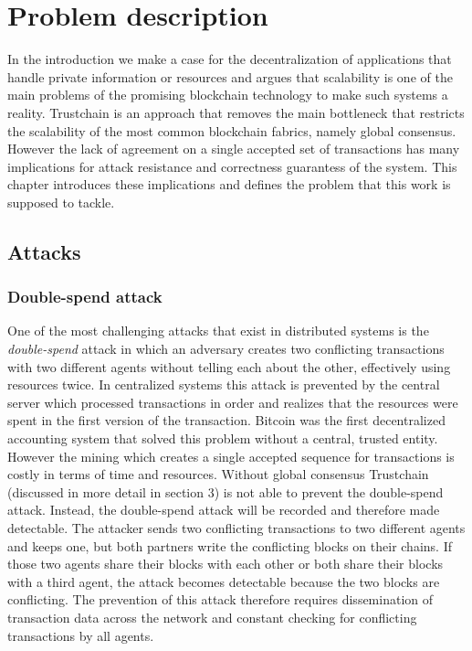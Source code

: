 \chapter{Problem description}
In the introduction we make a case for the decentralization of applications that handle private
information or resources and argues that scalability is one of the main problems of the promising
blockchain technology to make such systems a reality. Trustchain is an approach that removes the 
main bottleneck that restricts the scalability of the most common blockchain fabrics, namely global
consensus. However the lack of agreement on a single accepted set of transactions has many 
implications for attack resistance and correctness guarantess of the system. This chapter 
introduces these implications and defines the problem that this work is supposed to tackle.

\section{Attacks}

\subsection{Double-spend attack}
One of the most challenging attacks that exist in distributed systems is the \textit{double-spend}
attack in which an adversary creates two conflicting transactions with two different agents without
telling each about the other, effectively using resources twice. In centralized systems this attack
is prevented by the central server which processed transactions in order and realizes that the 
resources were spent in the first version of the transaction. Bitcoin was the first decentralized
accounting system that solved this problem without a central, trusted entity. However the mining
which creates a single accepted sequence for transactions is costly in terms of time and resources.
Without global consensus Trustchain (discussed in more detail in section 3) is not able to prevent 
the double-spend attack. Instead, the double-spend attack will be recorded and therefore made 
detectable. The attacker sends two conflicting transactions to two different agents and keeps one,
but both partners write the conflicting blocks on their chains. If those two agents share their 
blocks with each other or both share their blocks with a third agent, the attack becomes detectable
because the two blocks are conflicting. The prevention of this attack therefore requires 
dissemination of transaction data across the network and constant checking for conflicting 
transactions by all agents.

